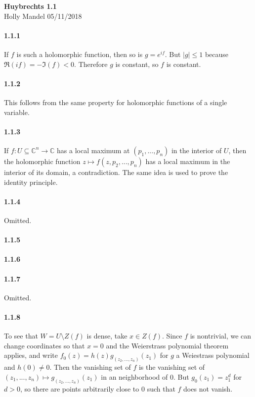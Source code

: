 \documentclass[10pt,letter]{article}
\begin{document}
\begin{center} 
{\bf Huybrechts 1.1} \\
Holly Mandel 05/11/2018
\end{center}

\paragraph*{1.1.1} If $f$ is such a holomorphic function, then so is $g = e^{if}$. But $\vert g \vert \leq 1$ because  $\Re(if) = - \Im(f)  < 0$. Therefore $g$ is constant, so $f$ is constant.  
\paragraph*{1.1.2} This follows from the same property for holomorphic functions of a single variable. 
\paragraph*{1.1.3} If $f: U \subseteq \mathbb{C}^n \rightarrow \mathbb{C}$ has a local maximum at $(p_1,...,p_n)$ in the interior of $U$, then the holomorphic function $z \mapsto f(z,p_2,...,p_n)$ has a local maximum in the interior of its domain, a contradiction. The same idea is used to prove the identity principle.
\paragraph*{1.1.4} Omitted.
\paragraph*{1.1.5} 
\paragraph*{1.1.6} 
\paragraph*{1.1.7} Omitted.
\paragraph*{1.1.8} To see that $W = U \setminus Z(f)$ is dense, take $x \in Z(f)$. Since $f$ is nontrivial, we can change coordinates so that $x = 0$ and the Weierstrass polynomial theorem applies, and write $f_0(z) = h(z) g_{(z_2,...,z_n)}(z_1)$ for $g$ a Weiestrass polynomial and $h(0) \neq 0$. Then the vanishing set of $f$ is the vanishing set of $(z_1,...,z_n) \mapsto g_{(z_2,...,z_n)}(z_1)$ in an neighborhood of $0$. But $g_{0}(z_1) = z_1^d$ for $d > 0$, so there are points arbitrarily close to $0$ such that $f$ does not vanish. 
\end{document}
